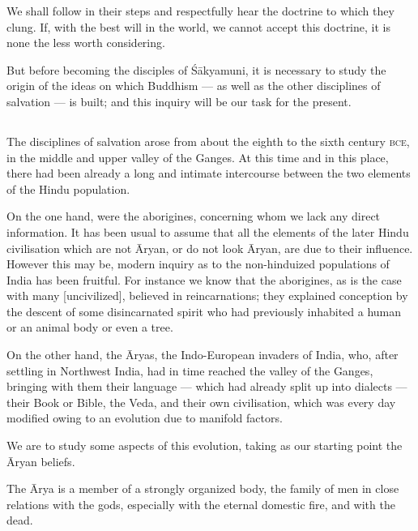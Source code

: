 \documentclass[a4paper, 11pt, oneside, english, landscape]{article}
\begin{document}
We shall follow in their steps and respectfully hear the doctrine to which they clung. If, with the best will in the world, we cannot accept this doctrine, it is none the less worth considering.

But before becoming the disciples of Śākyamuni, it is necessary to study the origin of the ideas on which Buddhism --- as well as the other disciplines of salvation --- is built; and this inquiry will be our task for the present.

\subsection{}
\paragraph{}
The disciplines of salvation arose from about the eighth to the sixth century \textsc{bce}, in the middle and upper valley of the Ganges. At this time and in this place, there had been already a long and intimate intercourse between the two elements of the Hindu population.

On the one hand, were the aborigines, concerning whom we lack any direct information. It has been usual to assume that all the elements of the later Hindu civilisation which are not Āryan, or do not look Āryan, are due to their influence. However this may be, modern inquiry as to the non-hinduized populations of India has been fruitful. For instance we know that the aborigines, as is the case with many [uncivilized], believed in reincarnations; they explained conception by the descent of some disincarnated spirit who had previously inhabited a human or an animal body or even a tree.

On the other hand, the Āryas, the Indo-European invaders of India, who, after settling in Northwest India, had in time reached the valley of the Ganges, bringing with them their language --- which had already split up into dialects --- their Book or Bible, the Veda, and their own civilisation, which was every day modified owing to an evolution due to manifold factors.

We are to study some aspects of this evolution, taking as our starting point the Āryan beliefs.

The Ārya is a member of a strongly organized body, the family of men in close relations with the gods, especially with the eternal domestic fire, and with the dead.
\end{document}
